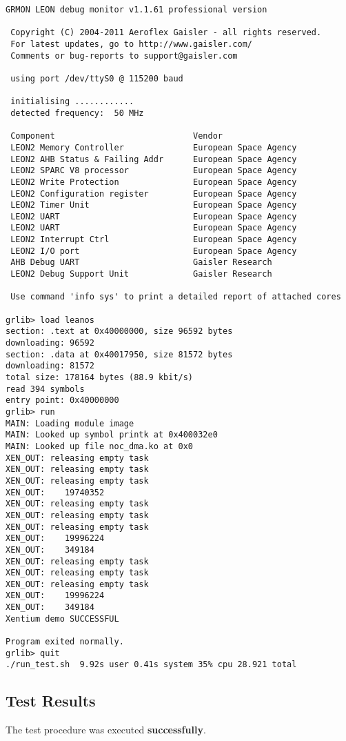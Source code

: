 \begin{Verbatim}[frame=single, rulecolor=\color{uvie-blue!75}]
 GRMON LEON debug monitor v1.1.61 professional version

 Copyright (C) 2004-2011 Aeroflex Gaisler - all rights reserved.
 For latest updates, go to http://www.gaisler.com/
 Comments or bug-reports to support@gaisler.com

 using port /dev/ttyS0 @ 115200 baud

 initialising ............
 detected frequency:  50 MHz

 Component                            Vendor
 LEON2 Memory Controller              European Space Agency
 LEON2 AHB Status & Failing Addr      European Space Agency
 LEON2 SPARC V8 processor             European Space Agency
 LEON2 Write Protection               European Space Agency
 LEON2 Configuration register         European Space Agency
 LEON2 Timer Unit                     European Space Agency
 LEON2 UART                           European Space Agency
 LEON2 UART                           European Space Agency
 LEON2 Interrupt Ctrl                 European Space Agency
 LEON2 I/O port                       European Space Agency
 AHB Debug UART                       Gaisler Research
 LEON2 Debug Support Unit             Gaisler Research

 Use command 'info sys' to print a detailed report of attached cores

grlib> load leanos
section: .text at 0x40000000, size 96592 bytes
downloading: 96592
section: .data at 0x40017950, size 81572 bytes
downloading: 81572
total size: 178164 bytes (88.9 kbit/s)
read 394 symbols
entry point: 0x40000000
grlib> run
MAIN: Loading module image
MAIN: Looked up symbol printk at 0x400032e0
MAIN: Looked up file noc_dma.ko at 0x0
XEN_OUT: releasing empty task
XEN_OUT: releasing empty task
XEN_OUT: releasing empty task
XEN_OUT: 	19740352
XEN_OUT: releasing empty task
XEN_OUT: releasing empty task
XEN_OUT: releasing empty task
XEN_OUT: 	19996224
XEN_OUT: 	349184
XEN_OUT: releasing empty task
XEN_OUT: releasing empty task
XEN_OUT: releasing empty task
XEN_OUT: 	19996224
XEN_OUT: 	349184
Xentium demo SUCCESSFUL

Program exited normally.
grlib> quit
./run_test.sh  9.92s user 0.41s system 35% cpu 28.921 total

\end{Verbatim}

\subsection*{Test Results}

The test procedure was executed \textbf{successfully}.



